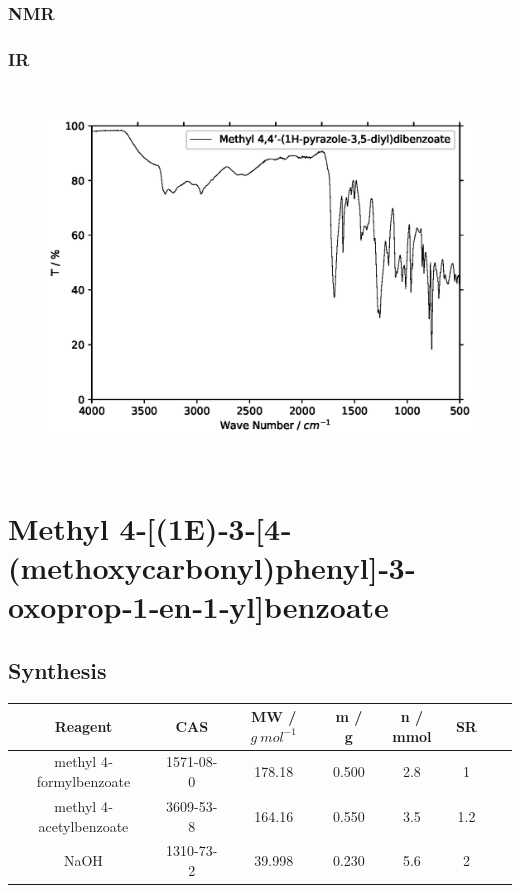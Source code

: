 \documentclass[../Master.tex]{subfiles}
\begin{document}
\subsubsection{NMR}
\subsubsection{IR}
\begin{figure}[h!]
	\centering
	\includegraphics[width=20cm,height=10cm,keepaspectratio]{Spectra/pyr-est.eps}
\end{figure}

\section{Methyl 4‐[(1E)‐3‐[4‐(methoxycarbonyl)phenyl]‐3‐oxoprop‐1‐en‐1‐yl]benzoate}
\subsection{Synthesis}
\begin{center}
	\begin{tabular}[b]{cccccccc}
		\toprule
		Reagent                 & CAS       & MW / \(g \ mol^{-1}\) & m / g & n / mmol & SR  \\
		\midrule
		methyl 4‐formylbenzoate & 1571-08-0 & 178.18                & 0.500 & 2.8      & 1   \\
		methyl 4‐acetylbenzoate & 3609-53-8 & 164.16                & 0.550 & 3.5      & 1.2 \\
		NaOH                    & 1310-73-2 & 39.998                & 0.230 & 5.6      & 2   \\
		\bottomrule
	\end{tabular}
\end{center}
\end{document}

